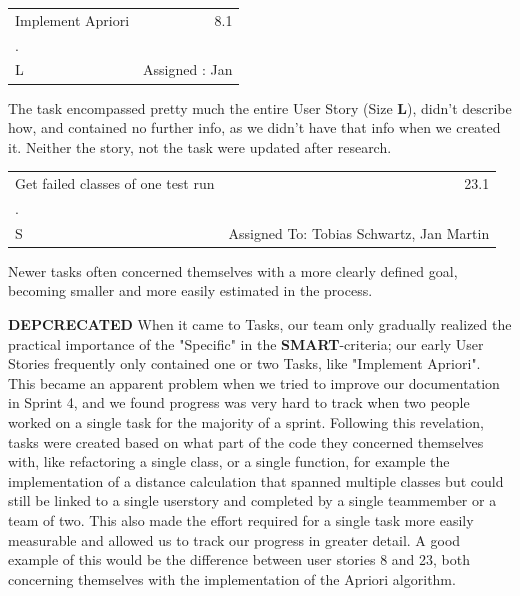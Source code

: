 \begin{table}
  \label{Example Task 1: 8.1}
  \centering
	\begin{tabular}[!th]{ |p{3.5cm} p{2.7cm}| }
	\hline
	Implement Apriori \hfill \break & \multicolumn{1}{r}{8.1} \\
	 . & \\
	 \hfill \break
	 L & \hfill \break Assigned : Jan \\
	 \hline
	\end{tabular}
\end{table}

The task encompassed pretty much the entire User Story (Size \textbf{L}), didn't describe how, and contained no further info, as we didn't have that info when we created it. Neither the story, not the task were updated after research.

\begin{table}
  \label{Example Task 2: 23.1}
  \centering
	\begin{tabular}[!h]{ |p{3.5cm} p{2.7cm}| }
	\hline
	Get failed classes of one test run & \multicolumn{1}{r}{23.1} \\
	 . & \\
	 \hfill \break \break
	 S & Assigned To: \break Tobias Schwartz, \break Jan Martin \\
	 \hline
	\end{tabular}
\end{table}
Newer tasks often concerned themselves with a more clearly defined goal, becoming smaller and more easily estimated in the process. 

\newpage
\textbf{DEPCRECATED}
When it came to Tasks, our team only gradually realized the practical importance of the "Specific" in the \textbf{ SMART}-criteria; our early User Stories frequently only contained one or two Tasks, like "Implement Apriori". This became an apparent problem when we tried to improve our documentation in Sprint 4, and we found progress was very hard to track when two people worked on a single task for the majority of a sprint. 
Following this revelation, tasks were created based on what part of the code they concerned themselves with, like refactoring a single class, or a single function, for example the implementation of a distance calculation that spanned multiple classes but could still be linked to a single userstory and completed by a single teammember or a team of two. 
This also made the effort required for a single task more easily measurable and allowed us to track our progress in greater detail. A good example of this would be the difference between user stories 8 and 23, both concerning themselves with the implementation of the Apriori algorithm.

